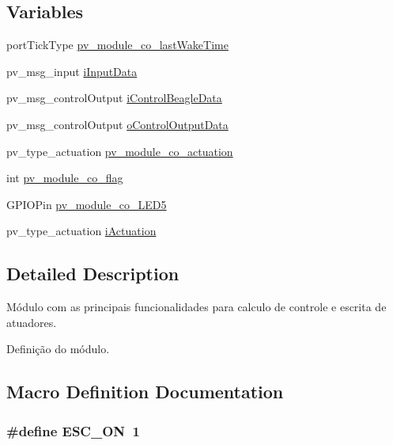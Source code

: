 \subsection*{Variables}
\begin{DoxyCompactItemize}
\item 
port\+Tick\+Type \hyperlink{group__app__co_gab06dc9c7b584f053bcde9e3dd366c886}{pv\+\_\+module\+\_\+co\+\_\+last\+Wake\+Time}
\item 
pv\+\_\+msg\+\_\+input \hyperlink{group__app__co_gac40b8cfe5fd2000670ad57fe3e75ec89}{i\+Input\+Data}
\item 
pv\+\_\+msg\+\_\+control\+Output \hyperlink{group__app__co_ga01528088e36182dce9f2d7126db89886}{i\+Control\+Beagle\+Data}
\item 
pv\+\_\+msg\+\_\+control\+Output \hyperlink{group__app__co_ga0a14ca4568444d2d76c256fa91585cdf}{o\+Control\+Output\+Data}
\item 
pv\+\_\+type\+\_\+actuation \hyperlink{group__app__co_gaf0fb0cf3bcfc492356d3cbe85376efa3}{pv\+\_\+module\+\_\+co\+\_\+actuation}
\item 
int \hyperlink{group__app__co_ga4e39239e9a359dfd174056754a046b8a}{pv\+\_\+module\+\_\+co\+\_\+flag}
\item 
G\+P\+I\+O\+Pin \hyperlink{group__app__co_gaa7d4da6aed3ca0087db45a3706ef17fa}{pv\+\_\+module\+\_\+co\+\_\+\+L\+E\+D5}
\item 
pv\+\_\+type\+\_\+actuation \hyperlink{group__app__co_gaf6cc28f22186e2338a688b8e76d8c975}{i\+Actuation}
\end{DoxyCompactItemize}


\subsection{Detailed Description}
Módulo com as principais funcionalidades para calculo de controle e escrita de atuadores. 

Definição do módulo. 

\subsection{Macro Definition Documentation}
\subsubsection[{\texorpdfstring{E\+S\+C\+\_\+\+ON}{ESC_ON}}]{\setlength{\rightskip}{0pt plus 5cm}\#define E\+S\+C\+\_\+\+ON~1}\hypertarget{group__app__co_gaec8246e954743c1eca3ed9d0b934bf8e}{}\label{group__app__co_gaec8246e954743c1eca3ed9d0b934bf8e}


